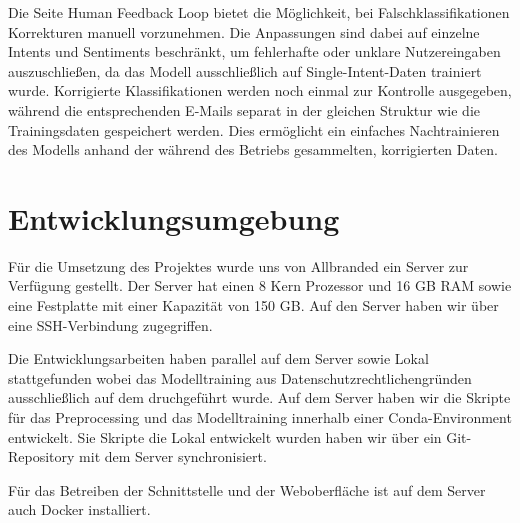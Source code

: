 Die Seite Human Feedback Loop bietet die Möglichkeit, bei Falschklassifikationen Korrekturen
manuell vorzunehmen. Die Anpassungen sind dabei auf einzelne Intents und Sentiments beschränkt,
um fehlerhafte oder unklare Nutzereingaben auszuschließen, da das Modell ausschließlich auf
Single-Intent-Daten trainiert wurde. Korrigierte Klassifikationen werden noch einmal zur
Kontrolle ausgegeben, während die entsprechenden E-Mails separat in der gleichen Struktur
wie die Trainingsdaten gespeichert werden. Dies ermöglicht ein einfaches Nachtrainieren des
Modells anhand der während des Betriebs gesammelten, korrigierten Daten. 

\section{Entwicklungsumgebung}

Für die Umsetzung des Projektes wurde uns von Allbranded ein Server zur Verfügung gestellt.
Der Server hat einen 8 Kern Prozessor und 16 GB RAM sowie eine Festplatte mit einer Kapazität von 150 GB.
Auf den Server haben wir über eine SSH-Verbindung zugegriffen.  

Die Entwicklungsarbeiten haben parallel auf dem Server sowie Lokal stattgefunden wobei das Modelltraining
aus Datenschutzrechtlichengründen ausschließlich auf dem druchgeführt wurde. Auf dem Server haben wir die
Skripte für das Preprocessing und das Modelltraining innerhalb einer Conda-Environment entwickelt. Sie
Skripte die Lokal entwickelt wurden haben wir über ein Git-Repository mit dem Server synchronisiert.  

Für das Betreiben der Schnittstelle und der Weboberfläche ist auf dem Server auch Docker installiert.